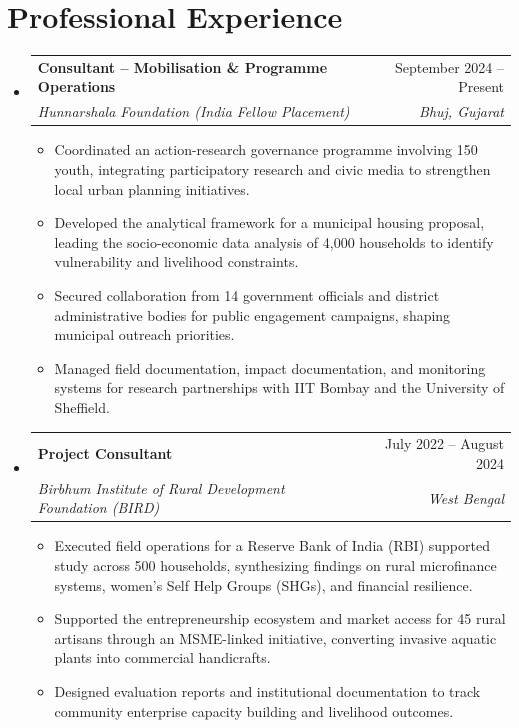 ﻿\documentclass[11pt,a4paper]{article}
\makeatletter
\newcommand{\resumeItem}[1]{\item\small{#1}}
\newcommand{\resumeHeading}[4]{
  \vspace{0.5ex}\item[]
    \begin{tabular*}{1\textwidth}[t]{l@{\extracolsep{\fill}}r}
      \textbf{#1} & #2 \\
      \textit{#3} & \textit{#4} \\
    \end{tabular*}\vspace{-1.5ex}
}
\makeatother
\begin{document}
\section*{Professional Experience}
\begin{itemize}[leftmargin=0in, label={}]
  \resumeHeading
    {Consultant -- Mobilisation \& Programme Operations}{September 2024 -- Present}
    {Hunnarshala Foundation (India Fellow Placement)}{Bhuj, Gujarat}
  \begin{itemize}[leftmargin=0.2in, label={--}]
    \resumeItem{Coordinated an action-research governance programme involving 150 youth, integrating participatory research and civic media to strengthen local urban planning initiatives.}
    \resumeItem{Developed the analytical framework for a municipal housing proposal, leading the socio-economic data analysis of 4,000 households to identify vulnerability and livelihood constraints.}
    \resumeItem{Secured collaboration from 14 government officials and district administrative bodies for public engagement campaigns, shaping municipal outreach priorities.}
    \resumeItem{Managed field documentation, impact documentation, and monitoring systems for research partnerships with IIT Bombay and the University of Sheffield.}
  \end{itemize}

  \resumeHeading
    {Project Consultant}{July 2022 -- August 2024}
    {Birbhum Institute of Rural Development Foundation (BIRD)}{West Bengal}
  \begin{itemize}[leftmargin=0.2in, label={--}]
    \resumeItem{Executed field operations for a Reserve Bank of India (RBI) supported study across 500 households, synthesizing findings on rural microfinance systems, women's Self Help Groups (SHGs), and financial resilience.}
    \resumeItem{Supported the entrepreneurship ecosystem and market access for 45 rural artisans through an MSME-linked initiative, converting invasive aquatic plants into commercial handicrafts.}
    \resumeItem{Designed evaluation reports and institutional documentation to track community enterprise capacity building and livelihood outcomes.}
  \end{itemize}
\end{itemize}

\end{document}
